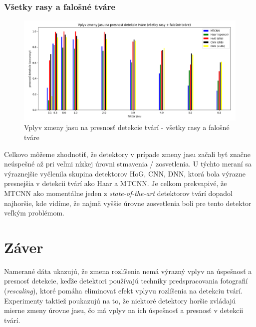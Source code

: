 \documentclass[]{article}
\begin{document}
	\subsubsection*{Všetky rasy a falošné tváre}
	\begin{figure}[h!]
		\includegraphics[width=\textwidth]{Vysledky_jas/all/Figure_1.png}
		\caption{Vplyv zmeny jasu na presnosť detekcie tvárí - všetky rasy a falošné tváre}
	\end{figure}

	Celkovo môžeme zhodnotiť, že detektory v prípade zmeny jasu začali byť značne neúspešné až pri veľmi nízkej úrovni stmavenia / zosvetlenia. U týchto meraní sa výraznejšie vyčlenila skupina detektorov HoG, CNN, DNN, ktorá bola výrazne presnejšia v detekcii tvárí ako Haar a MTCNN. Je celkom prekvapivé, že MTCNN ako momentálne jeden z \textit{state-of-the-art} detektorov tvárí dopadol najhoršie, kde vidíme, že najmä vyššie úrovne zosvetlenia boli pre tento detektor veľkým problémom.
	
	\section{Záver}
	
	Namerané dáta ukazujú, že zmena rozlíšenia nemá výrazný vplyv na úspešnosť a presnosť detekcie, keďže detektori používajú techniky predspracovania fotografií (\textit{rescaling}), ktoré pomáha eliminovať efekt vplyvu rozlíšenia na detekciu tvárí. Experimenty taktiež poukazujú na to, že niektoré detektory horšie zvládajú mierne zmeny úrovne jasu, čo má vplyv na ich úspešnosť a presnosť v detekcii tvárí.
	
	
\end{document}
